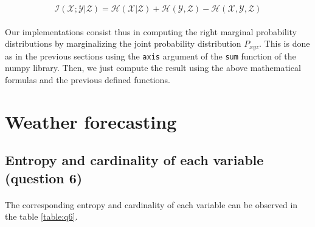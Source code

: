 \documentclass[a4paper, 11pt, oneside]{article}
\begin{document}
$$ \mathcal{I}(\mathcal{X}; \mathcal{Y} | \mathcal{Z}) = \mathcal{H}(\mathcal{X} | \mathcal{Z}) + \mathcal{H}(\mathcal{Y}, \mathcal{Z}) - \mathcal{H}(\mathcal{X}, \mathcal{Y}, \mathcal{Z})$$

\paragraph{}Our implementations consist thus in computing the right marginal probability distributions by marginalizing the joint probability distribution $P_{xyz}$. This is done as in the previous sections using the \texttt{axis} argument of the \texttt{sum} function of the numpy library. Then, we just compute the result using the above mathematical formulas and the previous defined functions.

\section{Weather forecasting}

\subsection{Entropy and cardinality of each variable (question 6)}

\paragraph{}The corresponding entropy and cardinality of each variable can be observed in the table \ref{table:q6}.
\end{document}

